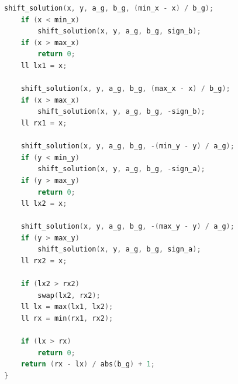 \documentclass[10pt,landscape,a4paper,twocolumn]{article}
\begin{document}
\begin{lstlisting}[language=C++]
    shift_solution(x, y, a_g, b_g, (min_x - x) / b_g);
    if (x < min_x)
        shift_solution(x, y, a_g, b_g, sign_b);
    if (x > max_x)
        return 0;
    ll lx1 = x;

    shift_solution(x, y, a_g, b_g, (max_x - x) / b_g);
    if (x > max_x)
        shift_solution(x, y, a_g, b_g, -sign_b);
    ll rx1 = x;

    shift_solution(x, y, a_g, b_g, -(min_y - y) / a_g);
    if (y < min_y)
        shift_solution(x, y, a_g, b_g, -sign_a);
    if (y > max_y)
        return 0;
    ll lx2 = x;

    shift_solution(x, y, a_g, b_g, -(max_y - y) / a_g);
    if (y > max_y)
        shift_solution(x, y, a_g, b_g, sign_a);
    ll rx2 = x;

    if (lx2 > rx2)
        swap(lx2, rx2);
    ll lx = max(lx1, lx2);
    ll rx = min(rx1, rx2);

    if (lx > rx)
        return 0;
    return (rx - lx) / abs(b_g) + 1;
}
\end{lstlisting}
\end{document}
